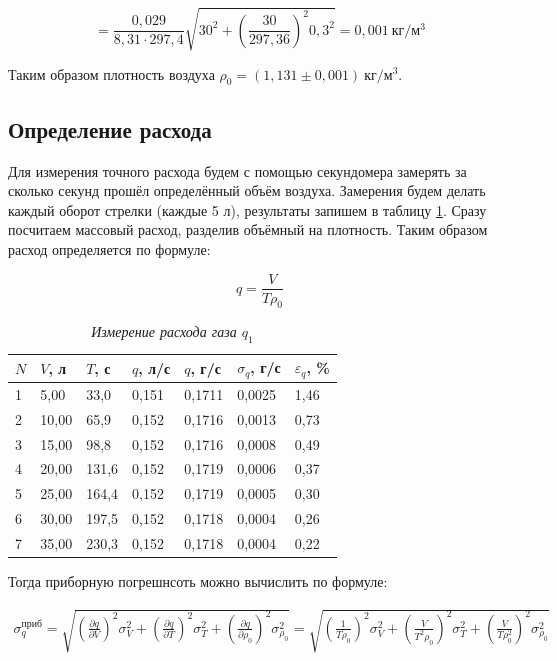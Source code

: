 \documentclass[a4paper,12pt]{article}
\begin{document}
\begin{equation}
    = \frac{0,029}{8,31 \cdot 297,4} \sqrt{ 30 ^ 2 + \left( \frac{30}{297,36} \right)^2 0,3 ^ 2} = 0,001 \ \text{кг}/\text{м}^3
\end{equation}

Таким образом плотность воздуха $\rho_0 = (1,131 \pm 0,001) \ \text{кг}/\text{м}^3$.

\subsection{Определение расхода}
\label{find-q}

Для измерения точного расхода будем с помощью секундомера замерять за сколько секунд прошёл определённый объём воздуха. Замерения будем делать каждый оборот стрелки (каждые 5 л), результаты запишем в таблицу \ref{q1}. Сразу посчитаем массовый расход, разделив объёмный на плотность. Таким образом расход определяется по формуле:

\begin{equation}
    q = \frac{V}{T \rho_0}
\end{equation}

\begin{table}[!ht]
    \centering
    \begin{tabular}{|l|l|l|l|l|l|l|}
    \hline
        $N$ & $V$, л & $T$, с & $q$, л/с & $q$, г/с & $\sigma_q$, г/с & $\varepsilon_q$, \% \\ \hline
        1 & 5,00 & 33,0 & 0,151 & 0,1711 & 0,0025 & 1,46 \\ \hline
        2 & 10,00 & 65,9 & 0,152 & 0,1716 & 0,0013 & 0,73 \\ \hline
        3 & 15,00 & 98,8 & 0,152 & 0,1716 & 0,0008 & 0,49 \\ \hline
        4 & 20,00 & 131,6 & 0,152 & 0,1719 & 0,0006 & 0,37 \\ \hline
        5 & 25,00 & 164,4 & 0,152 & 0,1719 & 0,0005 & 0,30 \\ \hline
        6 & 30,00 & 197,5 & 0,152 & 0,1718 & 0,0004 & 0,26 \\ \hline
        7 & 35,00 & 230,3 & 0,152 & 0,1718 & 0,0004 & 0,22 \\ \hline
    \end{tabular}\caption{\textit{Измерение расхода газа $q_1$}}\label{q1}
\end{table}

Тогда приборную погрешнсоть можно вычислить по формуле:

\begin{multline*}
    \sigma_q^\text{приб} = \sqrt{
    \left ( \frac{\partial q}{\partial V} \right )^2 \sigma_{V} ^ 2 +
    \left ( \frac{\partial q}{\partial T} \right )^2 \sigma_{T} ^ 2 +
    \left ( \frac{\partial q}{\partial \rho_0} \right )^2 \sigma_{\rho_0} ^ 2
    } = \sqrt{
    \left ( \frac{1}{T \rho_0} \right )^2 \sigma_{V} ^ 2 +
    \left ( \frac{V}{T^2 \rho_0} \right )^2 \sigma_{T} ^ 2 +
    \left ( \frac{V}{T \rho_0^2} \right )^2 \sigma_{\rho_0} ^ 2
    }
\end{multline*}
\end{document}
